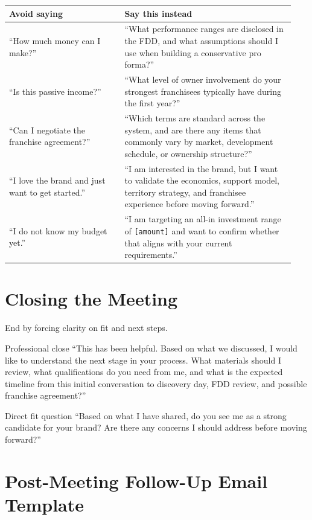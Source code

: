 \documentclass[11pt]{article}
\newcommand{\placeholder}[1]{\textcolor{accent}{\texttt{[#1]}}}
\begin{document}
\begin{longtable}{>{\raggedright\arraybackslash}p{0.38\linewidth}>{\raggedright\arraybackslash}p{0.56\linewidth}}
\toprule
\textbf{Avoid saying} & \textbf{Say this instead} \\
\midrule
``How much money can I make?'' & ``What performance ranges are disclosed in the FDD, and what assumptions should I use when building a conservative pro forma?'' \\
``Is this passive income?'' & ``What level of owner involvement do your strongest franchisees typically have during the first year?'' \\
``Can I negotiate the franchise agreement?'' & ``Which terms are standard across the system, and are there any items that commonly vary by market, development schedule, or ownership structure?'' \\
``I love the brand and just want to get started.'' & ``I am interested in the brand, but I want to validate the economics, support model, territory strategy, and franchisee experience before moving forward.'' \\
``I do not know my budget yet.'' & ``I am targeting an all-in investment range of \placeholder{amount} and want to confirm whether that aligns with your current requirements.'' \\
\bottomrule
\end{longtable}

\section{Closing the Meeting}

End by forcing clarity on fit and next steps.

\begin{scriptbox}{Professional close}
``This has been helpful. Based on what we discussed, I would like to understand the next stage in your process. What materials should I review, what qualifications do you need from me, and what is the expected timeline from this initial conversation to discovery day, FDD review, and possible franchise agreement?''
\end{scriptbox}

\begin{scriptbox}{Direct fit question}
``Based on what I have shared, do you see me as a strong candidate for your brand? Are there any concerns I should address before moving forward?''
\end{scriptbox}

\section{Post-Meeting Follow-Up Email Template}
\end{document}
